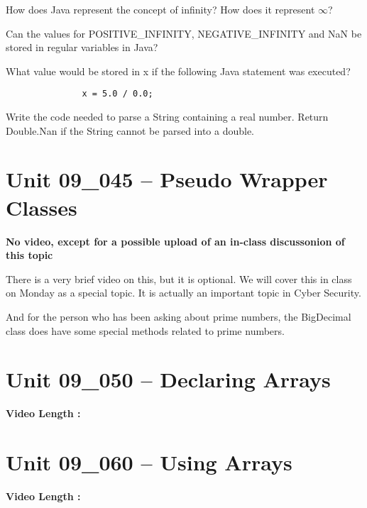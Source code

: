 \documentclass[letterpaper,12pt]{exam}
\newcommand{\unit}{Unit 09}
\begin{document}
\begin{questions}
\begin{samepage}
    \question How does Java represent the concept of infinity?  How does it represent $\infty$?
    \vspace{5mm}
\end{samepage}

\begin{samepage}
    \question Can the values for POSITIVE\_INFINITY, NEGATIVE\_INFINITY and NaN be stored in regular variables in Java?
    \vspace{5mm}
\end{samepage}

\begin{samepage}
    \question What value would be stored in x if the following Java statement was executed?
    \begin{verbatim}
               x = 5.0 / 0.0;
    \end{verbatim}
    \vspace{5mm}
\end{samepage}


\begin{samepage}
    \question Write the code needed to parse a String containing a real number.  Return Double.Nan if the String cannot be parsed into a double.
    \vspace{5mm}
\end{samepage}

\section*{\unit\_045 -- Pseudo Wrapper Classes} 
\par{\selectfont\textbf{No video, except for a possible upload of an in-class discussonion of this topic}}

There is a very brief video on this, but it is optional.  We will cover this in class on Monday as a special topic.  It is actually an important topic in Cyber Security.

And for the person who has been asking about prime numbers, the BigDecimal class does have some special methods related to prime numbers.

\section*{\unit\_050 -- Declaring Arrays} 
\par{\selectfont\textbf{Video Length :}}

\section*{\unit\_060 -- Using Arrays} 
\par{\selectfont\textbf{Video Length :}}


\end{questions}
\end{document}
